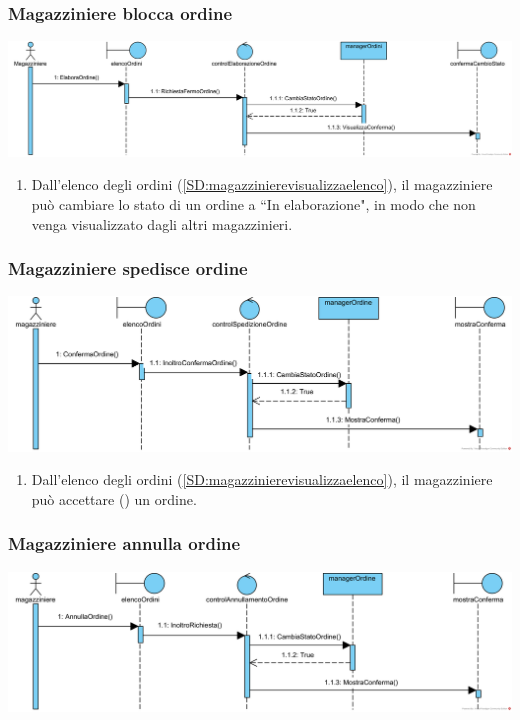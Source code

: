 \documentclass[12pt,a4paper]{article}
\begin{document}
\subsubsection{Magazziniere blocca ordine}
\label{SD:magazziniereblocca}
\begin{center}
\includegraphics[width=\textwidth]{SequenceDiagram/MagazziniereOrdineBlocca}
\end{center}

\begin{enumerate}
\item Dall'elenco degli ordini (\ref{SD:magazzinierevisualizzaelenco}), il magazziniere può cambiare lo stato di un ordine a ``In elaborazione", in modo che non venga visualizzato dagli altri magazzinieri.
\end{enumerate}

\subsubsection{Magazziniere spedisce ordine}
\label{SD:magazzinierespedisce}
\begin{center}
\includegraphics[width=\textwidth]{SequenceDiagram/MagazziniereOrdineSpedisce}
\end{center}

\begin{enumerate}
\item Dall'elenco degli ordini (\ref{SD:magazzinierevisualizzaelenco}), il magazziniere può accettare (\checkmark) un ordine.
\end{enumerate}

\subsubsection{Magazziniere annulla ordine}
\label{SD:magazzinierespedisce}
\begin{center}
\includegraphics[width=\textwidth]{SequenceDiagram/MagazziniereOrdineAnnulla}
\end{center}
\end{document}
